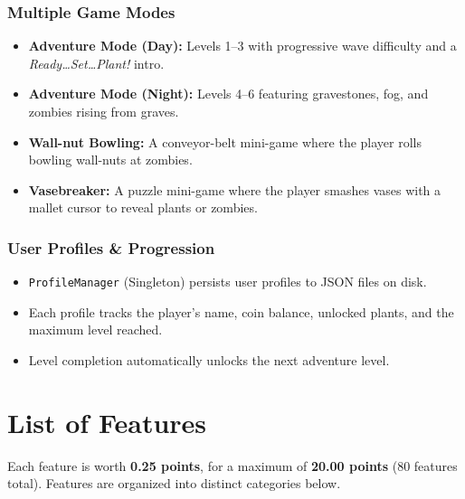\documentclass[12pt,a4paper]{article}
\begin{document}
\subsubsection{Multiple Game Modes}
\begin{itemize}[leftmargin=2em]
    \item \textbf{Adventure Mode (Day):} Levels 1--3 with progressive wave difficulty and a \emph{Ready\ldots Set\ldots Plant!} intro.
    \item \textbf{Adventure Mode (Night):} Levels 4--6 featuring gravestones, fog, and zombies rising from graves.
    \item \textbf{Wall-nut Bowling:} A conveyor-belt mini-game where the player rolls bowling wall-nuts at zombies.
    \item \textbf{Vasebreaker:} A puzzle mini-game where the player smashes vases with a mallet cursor to reveal plants or zombies.
\end{itemize}
\subsubsection{User Profiles \& Progression}
\begin{itemize}[leftmargin=2em]
    \item \texttt{ProfileManager} (Singleton) persists user profiles to JSON files on disk.
    \item Each profile tracks the player's name, coin balance, unlocked plants, and the maximum level reached.
    \item Level completion automatically unlocks the next adventure level.
\end{itemize}

\section{List of Features}
Each feature is worth \textbf{0.25 points}, for a maximum of \textbf{20.00 points} (80 features total). Features are organized into distinct categories below.
\end{document}
